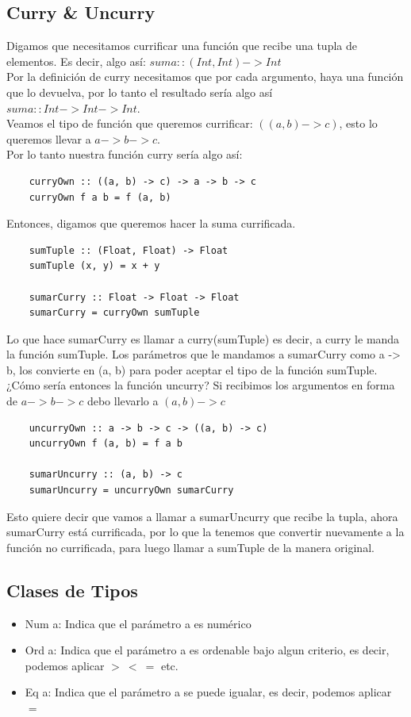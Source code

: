 \documentclass[10pt,a4paper]{article}
\begin{document}
\subsection*{Curry \& Uncurry}
\label{subsec:curry_uncurry}
Digamos que necesitamos currificar una función que recibe una tupla de elementos. Es decir, algo así: $ suma :: (Int, Int) -> Int $ \\
Por la definición de curry necesitamos que por cada argumento, haya una función que lo devuelva, por lo tanto el resultado sería algo así $ suma :: Int -> Int -> Int $. \\
Veamos el tipo de función que queremos currificar: $((a, b) -> c)$, esto lo queremos llevar a $a -> b -> c$. \\
Por lo tanto nuestra función curry sería algo así: 
\begin{lstlisting}
    curryOwn :: ((a, b) -> c) -> a -> b -> c
    curryOwn f a b = f (a, b) 
\end{lstlisting}
Entonces, digamos que queremos hacer la suma currificada. 
\begin{lstlisting}
    sumTuple :: (Float, Float) -> Float
    sumTuple (x, y) = x + y

    sumarCurry :: Float -> Float -> Float
    sumarCurry = curryOwn sumTuple
\end{lstlisting}

Lo que hace sumarCurry es llamar a curry(sumTuple) es decir, a curry le manda la función sumTuple. Los parámetros que le mandamos a sumarCurry como a -> b, los convierte en (a, b) para poder aceptar el tipo de la función sumTuple. \\

¿Cómo sería entonces la función uncurry? 
Si recibimos los argumentos en forma de $ a -> b -> c$ debo llevarlo a $ (a, b) -> c$
\begin{lstlisting}
    uncurryOwn :: a -> b -> c -> ((a, b) -> c)
    uncurryOwn f (a, b) = f a b

    sumarUncurry :: (a, b) -> c
    sumarUncurry = uncurryOwn sumarCurry
\end{lstlisting}
Esto quiere decir que vamos a llamar a sumarUncurry que recibe la tupla, ahora sumarCurry está currificada, por lo que la tenemos que convertir nuevamente a la función no currificada, para luego llamar a sumTuple de la manera original.
\subsection*{Clases de Tipos}
\label{subsec:clases_tipos}
\begin{itemize}
    \item Num a: Indica que el parámetro a es numérico
    \item Ord a: Indica que el parámetro a es ordenable bajo algun criterio, es decir, podemos aplicar $ > \ < \ =$ etc.
    \item Eq a: Indica que el parámetro a se puede igualar, es decir, podemos aplicar $=$
\end{itemize}
\end{document}
